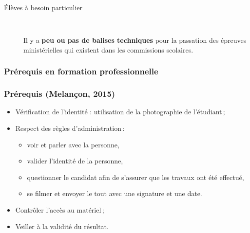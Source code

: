 \documentclass{beamer}
\begin{document}
\begin{frame}[allowframebreaks]
\begin{description}
					\item[Élèves à besoin particulier] \ \ \par Il y a \textbf{peu ou pas de balises techniques} pour la passation des épreuves ministérielles qui existent dans les commissions scolaires.
				\end{description}	
			\end{frame}
			
					
		\subsubsection{Prérequis en formation professionnelle} 
				\begin{frame}
					\frametitle{Prérequis (Melançon, 2015)}
				 	
				 	\begin {itemize}
						\item Vérification de l’identité : utilisation de la photographie de l’étudiant\,;
						\item Respect des règles d’administration\,:
							\begin {itemize}
								\item voir et parler avec la personne,
								\item valider l’identité de la personne,
								\item questionner le candidat afin de s’assurer que les travaux ont été effectué,
								\item se filmer et envoyer le tout avec une signature et une date.
							\end{itemize}
						\item Contrôler l’accès au matériel\,;
						\item Veiller à la validité du résultat.
					\end{itemize}
				\end{frame}
				
\end{document}
